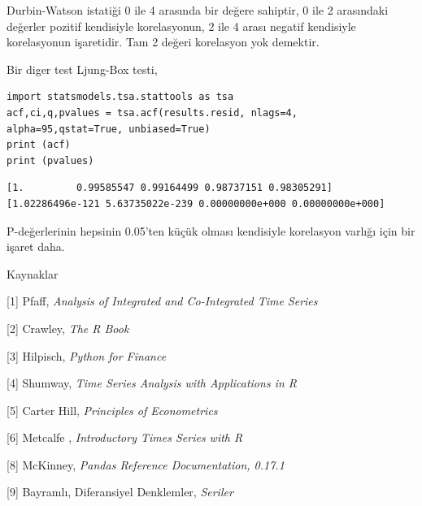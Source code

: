\documentclass[12pt,fleqn]{article}\usepackage{../../common}
\begin{document}
Durbin-Watson istatiği 0 ile 4 arasında bir değere sahiptir, 0 ile 2 arasındaki
değerler pozitif kendisiyle korelasyonun, 2 ile 4 arası negatif kendisiyle
korelasyonun işaretidir. Tam 2 değeri korelasyon yok demektir.

Bir diger test Ljung-Box testi, 

\begin{verbatim}
import statsmodels.tsa.stattools as tsa
acf,ci,q,pvalues = tsa.acf(results.resid, nlags=4, alpha=95,qstat=True, unbiased=True)
print (acf)
print (pvalues)
\end{verbatim}

\begin{verbatim}
[1.         0.99585547 0.99164499 0.98737151 0.98305291]
[1.02286496e-121 5.63735022e-239 0.00000000e+000 0.00000000e+000]
\end{verbatim}

P-değerlerinin hepsinin 0.05'ten küçük olması kendisiyle korelasyon varlığı
için bir işaret daha.

Kaynaklar

[1] Pfaff, {\em Analysis of Integrated and Co-Integrated Time Series}

[2] Crawley, {\em The R Book}

[3] Hilpisch, {\em Python for Finance}

[4] Shumway, {\em Time Series Analysis with Applications in R}

[5] Carter Hill, {\em Principles of Econometrics}

[6] Metcalfe , {\em Introductory Times Series with R}

[8] McKinney, {\em Pandas Reference Documentation, 0.17.1}

[9] Bayramlı, Diferansiyel Denklemler, {\em Seriler}
\end{document}
